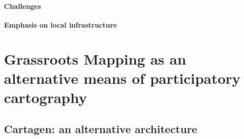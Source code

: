 \documentclass[11pt]{report}
\begin{document}
\subsubsection{Challenges}
\textbf{Emphasis on local infrastructure}

\chapter{Grassroots Mapping as an alternative means of participatory cartography}
\section{Cartagen: an alternative architecture}
\end{document}
